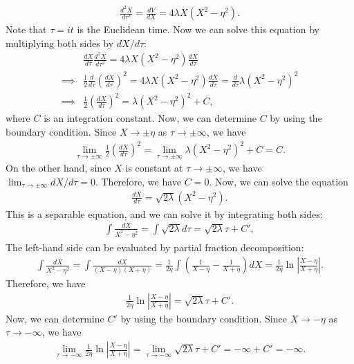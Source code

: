 \begin{align}
    \frac{d^2 X}{d\tau^2} = \frac{dV}{dX} = 4\lambda X (X^2 - \eta^2).
\end{align}
Note that $\tau=it$ is the Euclidean time. Now we can solve this equation by multiplying both sides by $dX/d\tau$:
\begin{align}
    &\frac{dX}{d\tau} \frac{d^2 X}{d\tau^2} = 4\lambda X (X^2 - \eta^2) \frac{dX}{d\tau}\\
    \implies& \frac{1}{2} \frac{d}{d\tau} \left( \frac{dX}{d\tau} \right)^2 = 4\lambda X (X^2 - \eta^2) \frac{dX}{d\tau}= \frac{d}{d\tau} \lambda (X^2 - \eta^2)^2\\
    \implies&\frac{1}{2} \left( \frac{dX}{d\tau} \right)^2 = \lambda (X^2 - \eta^2)^2 + C,
\end{align}
where $C$ is an integration constant. Now, we can determine $C$ by using the boundary condition. Since $X \to \pm \eta$ as $\tau \to \pm \infty$, we have
\begin{align}
    \lim_{\tau \to \pm \infty} \frac{1}{2} \left( \frac{dX}{d\tau} \right)^2 = \lim_{\tau \to \pm \infty} \lambda (X^2 - \eta^2)^2 + C = C.
\end{align}
On the other hand, since $X$ is constant at $\tau \to \pm \infty$, we have $\lim_{\tau \to \pm \infty} dX/d\tau = 0$. Therefore, we have $C=0$. Now, we can solve the equation
\begin{align}
    \frac{dX}{d\tau} = \sqrt{2\lambda} (X^2 - \eta^2).
\end{align}
This is a separable equation, and we can solve it by integrating both sides:
\begin{align}
    \int \frac{dX}{X^2 - \eta^2} = \int \sqrt{2\lambda} d\tau= \sqrt{2\lambda} \tau + C',
\end{align}
The left-hand side can be evaluated by partial fraction decomposition:
\begin{align}
    \int \frac{dX}{X^2 - \eta^2} = \int \frac{dX}{(X-\eta)(X+\eta)} = \frac{1}{2\eta} \int \left( \frac{1}{X-\eta} - \frac{1}{X+\eta} \right) dX = \frac{1}{2\eta} \ln \left| \frac{X-\eta}{X+\eta} \right|.
\end{align}
Therefore, we have
\begin{align}
    \frac{1}{2\eta} \ln \left| \frac{X-\eta}{X+\eta} \right| = \sqrt{2\lambda} \tau + C'.
\end{align}
Now, we can determine $C'$ by using the boundary condition. Since $X \to -\eta$ as $\tau \to -\infty$, we have
\begin{align}
    \lim_{\tau \to -\infty} \frac{1}{2\eta} \ln \left| \frac{X-\eta}{X+\eta} \right| = \lim_{\tau \to -\infty} \sqrt{2\lambda} \tau + C' = -\infty + C' = -\infty.
\end{align}
